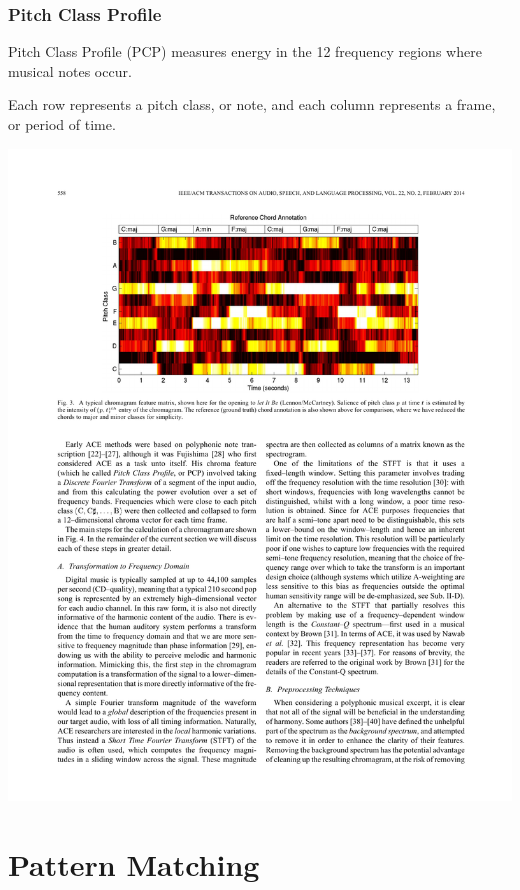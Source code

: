 \documentclass{beamer}
\newcommand{\linespace}{\vskip 0.25cm}
\begin{document}
\begin{frame}
  \frametitle{Pitch Class Profile}
  
Pitch Class Profile (PCP) measures energy in the 12 frequency regions where musical notes occur.



\linespace
 
Each row represents a pitch class, or note, and each column represents a frame, or period of time.
 \begin{center}
   \includegraphics[width=.8\textwidth]{fig4.pdf}
 \end{center}

\end{frame}



\section[Pattern Matching]{Pattern Matching}
\end{document}
